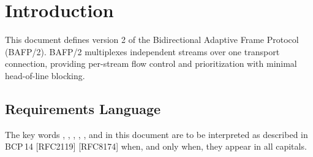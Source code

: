 \section{Introduction}
This document defines version 2 of the Bidirectional Adaptive Frame Protocol (BAFP/2).
BAFP/2 multiplexes independent streams over one transport connection, providing per-stream
flow control and prioritization with minimal head-of-line blocking.

\subsection{Requirements Language}
The key words , , , , , and
 in this document are to be interpreted as described in BCP\,14 [RFC2119] [RFC8174]
when, and only when, they appear in all capitals.
